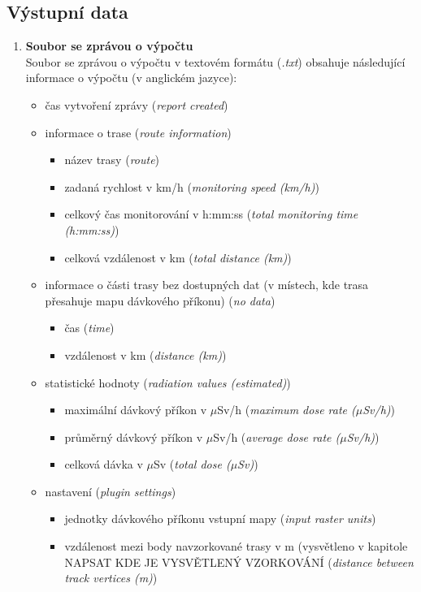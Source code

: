 \subsection{Výstupní data}
\begin{enumerate}
	\item \textbf{Soubor se zprávou o výpočtu} \\
	Soubor se zprávou o výpočtu v textovém formátu (\textit{.txt}) obsahuje následující informace o výpočtu (v anglickém jazyce):
		\begin{itemize}
			\item čas vytvoření zprávy (\textit{report created})
			
			\item informace o trase (\textit{route information})
			\begin{itemize}
				\item název trasy (\textit{route})
				\item zadaná rychlost v km/h (\textit{monitoring speed (km/h)})
				\item celkový čas monitorování v h:mm:ss (\textit{total monitoring time (h:mm:ss)})
				\item celková vzdálenost v km (\textit{total distance (km)})
			\end{itemize}
			
			\item informace o části trasy bez dostupných dat (v místech, kde trasa přesahuje mapu dávkového příkonu) (\textit{no data})
			\begin{itemize}
				\item čas (\textit{time})
				\item vzdálenost v km (\textit{distance (km)})
			\end{itemize}
			
			\item statistické hodnoty (\textit{radiation values (estimated)})
			\begin{itemize}
				\item maximální dávkový příkon v $\mu$Sv/h (\textit{maximum dose rate ($\mu$Sv/h)})
				\item průměrný dávkový příkon v $\mu$Sv/h (\textit{average dose rate ($\mu$Sv/h)})
				\item celková dávka v $\mu$Sv (\textit{total dose ($\mu$Sv)})
			\end{itemize}
			
			\item nastavení (\textit{plugin settings})
			\begin{itemize}
				\item jednotky dávkového příkonu vstupní mapy (\textit{input raster units})
				\item vzdálenost mezi body navzorkované trasy v m (vysvětleno v kapitole NAPSAT KDE JE VYSVĚTLENÝ VZORKOVÁNÍ (\textit{distance between track vertices (m)})
			\end{itemize}
			

\end{itemize}
\end{enumerate}

